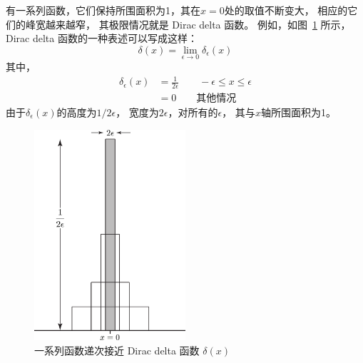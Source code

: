 有一系列函数，它们保持所围面积为1，其在$x=0$处的取值不断变大，
相应的它们的峰宽越来越窄，
其极限情况就是 Dirac delta 函数。
例如，如图~\ref{fg:1.1} 所示，
Dirac delta 函数的一种表述可以写成这样：
\begin{equation}
 \delta(x) = \lim_{\epsilon\rightarrow0}\delta_{\epsilon}(x)
 \label{eq:1.125}
\end{equation}
其中，
\begin{equation}
 \begin{split}
     \delta_{\epsilon}(x) &= \frac{1}{2\epsilon} \qquad -\epsilon \leq x \leq \epsilon \\
     &= 0 \qquad \text{其他情况}
 \end{split}
 \label{eq:1.126}
\end{equation}
由于$\delta_{\epsilon}(x)$的高度为$1/2\epsilon$，
宽度为$2\epsilon$，对所有的$\epsilon$，
其与$x$轴所围面积为1。

\begin{figure}
 \centering
 \includegraphics[width=0.5\textwidth]{./Pictures/fig.1.1.pdf}
 \caption{一系列函数递次接近 Dirac delta 函数 $\delta(x)$}
 \label{fg:1.1}
\end{figure}


